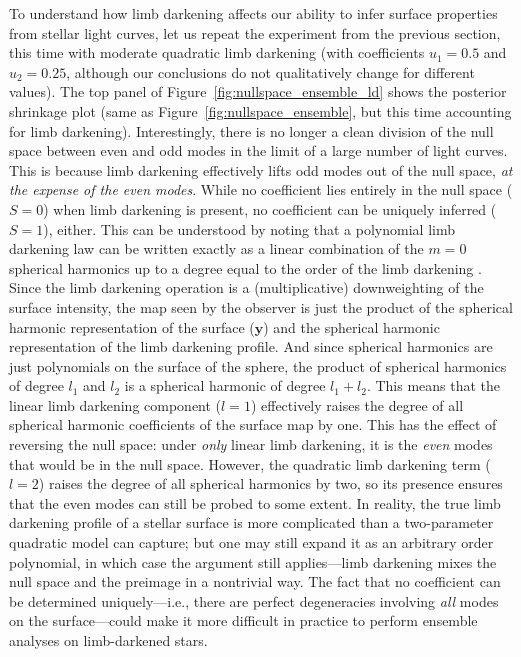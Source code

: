 \documentclass[modern]{aastex62}
\newcommand{\dfm}[1]{{\color{blue}#1}}
\begin{document}
To understand how limb darkening affects our ability to infer
surface properties from stellar light curves,
let us repeat the experiment from the previous section,
this time with moderate quadratic limb darkening (with coefficients
$u_1 = 0.5$ and $u_2 = 0.25$, \dfm{although our conclusions do not qualitatively change for different values}).
The top panel of Figure~\ref{fig:nullspace_ensemble_ld} shows the
posterior shrinkage plot (same as Figure~\ref{fig:nullspace_ensemble}, but
this time accounting for limb darkening). Interestingly, there is no longer a clean division of
the null space between even and odd modes in the limit of a large number
of light curves.
This is because limb darkening effectively lifts odd modes out of the null space, \emph{at the
    expense of the even modes}. While no coefficient lies entirely in the
null space ($S = 0$) when limb darkening is present, no coefficient
can be uniquely inferred ($S = 1$), either. This can be understood by noting that
a polynomial limb darkening law can be written
exactly as a linear combination of the $m=0$ spherical harmonics
up to a degree equal to the order of the limb darkening
\citep[in this case, $l = 2$;]{Luger2019,Agol2020}.
Since the limb darkening operation is a (multiplicative) downweighting of
the surface intensity, the map seen by the observer is just the product
of the spherical harmonic representation of the surface ($\mathbf{y}$)
and the spherical harmonic representation of the limb darkening profile.
And since spherical harmonics are just polynomials on the surface of the sphere,
the product of spherical harmonics of degree $l_1$ and $l_2$ is a spherical
harmonic of degree $l_1 + l_2$. This means that the linear limb darkening
component ($l = 1$) effectively raises the degree of all spherical harmonic
coefficients of the surface map by one. This has the effect of reversing
the null space: under \emph{only} linear limb darkening, it is the \emph{even}
modes that would be in the null space. However, the quadratic
limb darkening term ($l = 2$) raises the degree of all spherical harmonics by two,
so its presence ensures that the even modes can still be probed to some extent.
In reality, the true limb darkening profile of a stellar surface is more
complicated than a two-parameter quadratic model can capture; but one may still
expand it as an arbitrary order polynomial, in which case the argument still
applies---limb darkening mixes the null space and the preimage in a nontrivial
way.
%
The fact that no coefficient can be determined uniquely---i.e., there are
perfect degeneracies involving \emph{all} modes on the surface---could make it more
difficult in practice to perform ensemble analyses on limb-darkened stars.
\end{document}
